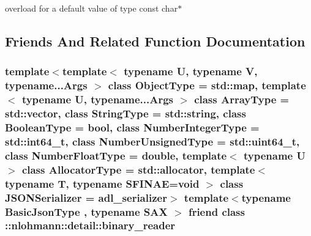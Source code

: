 overload for a default value of type const char$\ast$ 



\subsection{Friends And Related Function Documentation}
\subsubsection[{\texorpdfstring{\+::nlohmann\+::detail\+::binary\+\_\+reader}{::nlohmann::detail::binary_reader}}]{\setlength{\rightskip}{0pt plus 5cm}template$<$template$<$ typename U, typename V, typename...\+Args $>$ class Object\+Type = std\+::map, template$<$ typename U, typename...\+Args $>$ class Array\+Type = std\+::vector, class String\+Type  = std\+::string, class Boolean\+Type  = bool, class Number\+Integer\+Type  = std\+::int64\+\_\+t, class Number\+Unsigned\+Type  = std\+::uint64\+\_\+t, class Number\+Float\+Type  = double, template$<$ typename U $>$ class Allocator\+Type = std\+::allocator, template$<$ typename T, typename S\+F\+I\+N\+A\+E=void $>$ class J\+S\+O\+N\+Serializer = adl\+\_\+serializer$>$ template$<$typename Basic\+Json\+Type , typename S\+AX $>$ friend class \+::{\bf nlohmann\+::detail\+::binary\+\_\+reader}\hspace{0.3cm}{\ttfamily [friend]}}\hypertarget{classnlohmann_1_1basic__json_a3226693341c251507fec5d6f4fa5ce79}{}\label{classnlohmann_1_1basic__json_a3226693341c251507fec5d6f4fa5ce79}
